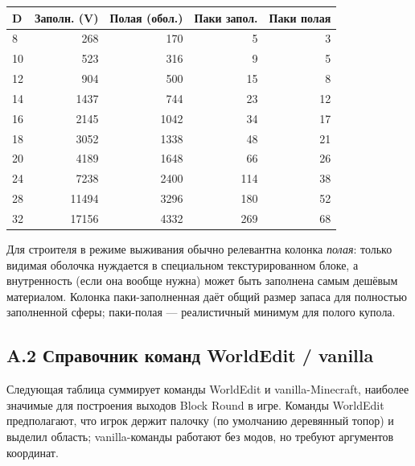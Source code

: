 \documentclass[12pt,a4paper]{scrartcl}
\begin{document}
\vspace{0.4em}
\begin{center}
\begin{tabular}{@{}lrrrr@{}}
\toprule
\textbf{D} & \textbf{Заполн. (V)} & \textbf{Полая (обол.)} & \textbf{Паки запол.} & \textbf{Паки полая} \\
\midrule
8   &   268 &   170 &  5  &  3  \\
10  &   523 &   316 &  9  &  5  \\
12  &   904 &   500 & 15  &  8  \\
14  &  1437 &   744 & 23  & 12  \\
16  &  2145 &  1042 & 34  & 17  \\
18  &  3052 &  1338 & 48  & 21  \\
20  &  4189 &  1648 & 66  & 26  \\
24  &  7238 &  2400 & 114 & 38  \\
28  & 11494 &  3296 & 180 & 52  \\
32  & 17156 &  4332 & 269 & 68  \\
\bottomrule
\end{tabular}
\end{center}

Для строителя в режиме выживания обычно релевантна колонка \emph{полая}: только видимая оболочка нуждается в специальном текстурированном блоке, а внутренность (если она вообще нужна) может быть заполнена самым дешёвым материалом. Колонка паки-заполненная даёт общий размер запаса для полностью заполненной сферы; паки-полая — реалистичный минимум для полого купола.

\subsection*{A.2 Справочник команд WorldEdit / vanilla}
Следующая таблица суммирует команды WorldEdit и vanilla-Minecraft, наиболее значимые для построения выходов Block Round в игре. Команды WorldEdit предполагают, что игрок держит палочку (по умолчанию деревянный топор) и выделил область; vanilla-команды работают без модов, но требуют аргументов координат.
\end{document}
